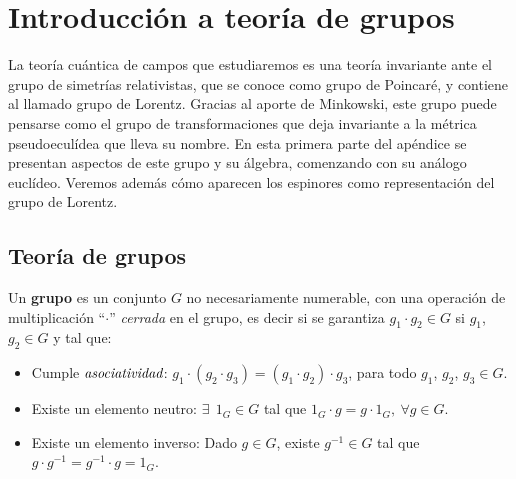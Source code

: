 

\chapter{Introducción a teoría de grupos}
\label{Apendice_A}

La teoría cuántica de campos que estudiaremos es una teoría invariante ante el grupo de simetrías
relativistas, que se conoce como grupo de Poincaré, y contiene al llamado grupo de Lorentz.
Gracias al aporte de Minkowski, este grupo puede pensarse como el grupo de transformaciones
que deja invariante a la métrica pseudoeculídea que lleva su nombre. En esta primera parte del 
apéndice se presentan aspectos de este grupo y su álgebra, comenzando con su análogo euclídeo. Veremos
además cómo aparecen los espinores como representación del grupo de Lorentz.

\section{Teoría de grupos}
\vspace{1cm}
\vspace{0.5cm}
\begin{definition}[Grupo]
Un \textbf{grupo} es un conjunto $G$ no necesariamente numerable, con una operación de multiplicación ``$\cdot$'' \emph{cerrada} en el grupo, es decir si se garantiza 
$g_{1} \cdot g_{2} \in G$ si $g_{1}$, $g_{2} \in G$ y tal que:
\begin{itemize}
    \item[a.] Cumple $\emph{asociatividad}$: $g_{1} \cdot (g_{2}\cdot g_{3})=(g_{1} \cdot g_{2})\cdot g_{3}$, para todo $g_{1}$, $g_{2}$, $g_{3} \in G$.
    \item[b.] Existe un elemento neutro: $\exists ~~ 1_{G} \in G$ tal que $1_{G}\cdot g=g\cdot 1_{G}, ~ \forall g \in G$. 
    \item[c.] Existe un elemento inverso: Dado $g \in G$, existe $g^{-1} \in G$ tal que $g\cdot g^{-1}=g^{-1}\cdot g=1_{G}$.
\end{itemize}
\end{definition}

